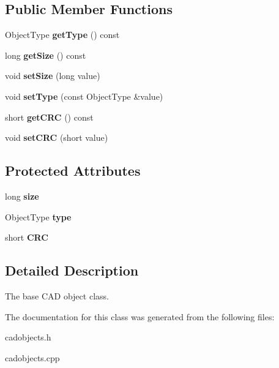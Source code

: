 \subsection*{Public Member Functions}
\begin{DoxyCompactItemize}
\item 
Object\+Type {\bfseries get\+Type} () const \hypertarget{class_c_a_d_object_aeb28c49575260e805dcb6e89bcab66d1}{}\label{class_c_a_d_object_aeb28c49575260e805dcb6e89bcab66d1}

\item 
long {\bfseries get\+Size} () const \hypertarget{class_c_a_d_object_a8804309e9a149fbabfd154b66ed1cdc6}{}\label{class_c_a_d_object_a8804309e9a149fbabfd154b66ed1cdc6}

\item 
void {\bfseries set\+Size} (long value)\hypertarget{class_c_a_d_object_abf6a52a76f5bedee3a821dab283d6be5}{}\label{class_c_a_d_object_abf6a52a76f5bedee3a821dab283d6be5}

\item 
void {\bfseries set\+Type} (const Object\+Type \&value)\hypertarget{class_c_a_d_object_aadba6a4e9cc766c22f8d3293fd34f053}{}\label{class_c_a_d_object_aadba6a4e9cc766c22f8d3293fd34f053}

\item 
short {\bfseries get\+C\+RC} () const \hypertarget{class_c_a_d_object_aeb42f23220a144dc8de8c70ba61dfa64}{}\label{class_c_a_d_object_aeb42f23220a144dc8de8c70ba61dfa64}

\item 
void {\bfseries set\+C\+RC} (short value)\hypertarget{class_c_a_d_object_abc58fdb22314817f2d5adc32b8cb5686}{}\label{class_c_a_d_object_abc58fdb22314817f2d5adc32b8cb5686}

\end{DoxyCompactItemize}
\subsection*{Protected Attributes}
\begin{DoxyCompactItemize}
\item 
long {\bfseries size}\hypertarget{class_c_a_d_object_a306f110c0f5e623796dddfd89c639501}{}\label{class_c_a_d_object_a306f110c0f5e623796dddfd89c639501}

\item 
Object\+Type {\bfseries type}\hypertarget{class_c_a_d_object_a6f467edf5a0fc2ed5e6b48d583623c2e}{}\label{class_c_a_d_object_a6f467edf5a0fc2ed5e6b48d583623c2e}

\item 
short {\bfseries C\+RC}\hypertarget{class_c_a_d_object_ab7af653f9c40a8de82f3a99cd705c6ae}{}\label{class_c_a_d_object_ab7af653f9c40a8de82f3a99cd705c6ae}

\end{DoxyCompactItemize}


\subsection{Detailed Description}
The base C\+AD object class. 

The documentation for this class was generated from the following files\+:\begin{DoxyCompactItemize}
\item 
cadobjects.\+h\item 
cadobjects.\+cpp\end{DoxyCompactItemize}
